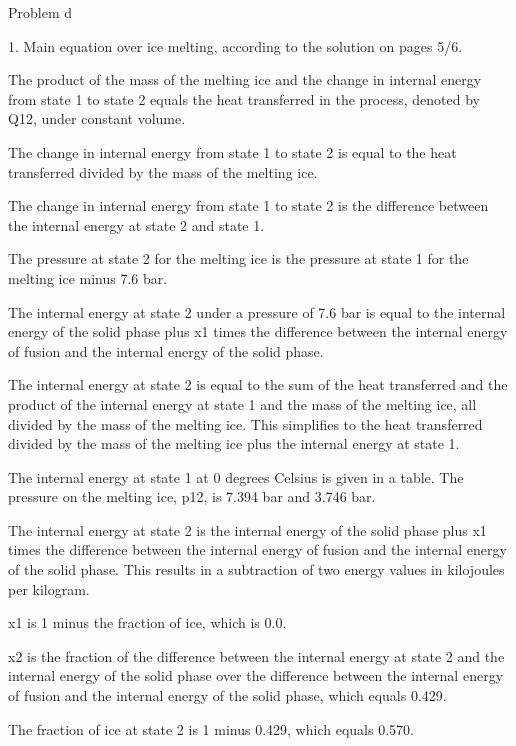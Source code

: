 Problem d

1. Main equation over ice melting, according to the solution on pages 5/6.

The product of the mass of the melting ice and the change in internal energy from state 1 to state 2 equals the heat transferred in the process, denoted by Q12, under constant volume.

The change in internal energy from state 1 to state 2 is equal to the heat transferred divided by the mass of the melting ice.

The change in internal energy from state 1 to state 2 is the difference between the internal energy at state 2 and state 1.

The pressure at state 2 for the melting ice is the pressure at state 1 for the melting ice minus 7.6 bar.

The internal energy at state 2 under a pressure of 7.6 bar is equal to the internal energy of the solid phase plus x1 times the difference between the internal energy of fusion and the internal energy of the solid phase.

The internal energy at state 2 is equal to the sum of the heat transferred and the product of the internal energy at state 1 and the mass of the melting ice, all divided by the mass of the melting ice. This simplifies to the heat transferred divided by the mass of the melting ice plus the internal energy at state 1.

The internal energy at state 1 at 0 degrees Celsius is given in a table. The pressure on the melting ice, p12, is 7.394 bar and 3.746 bar.

The internal energy at state 2 is the internal energy of the solid phase plus x1 times the difference between the internal energy of fusion and the internal energy of the solid phase. This results in a subtraction of two energy values in kilojoules per kilogram.

x1 is 1 minus the fraction of ice, which is 0.0.

x2 is the fraction of the difference between the internal energy at state 2 and the internal energy of the solid phase over the difference between the internal energy of fusion and the internal energy of the solid phase, which equals 0.429.

The fraction of ice at state 2 is 1 minus 0.429, which equals 0.570.